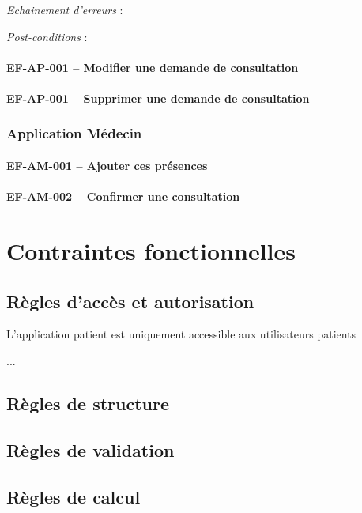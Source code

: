 \documentclass[a4paper,11pt]{article}
\begin{document}
	\textit{Echainement d'erreurs} :
	
	\textit{Post-conditions} :
	
	\paragraph{EF-AP-001 -- Modifier une demande de consultation}
	
	\paragraph{EF-AP-001 -- Supprimer une demande de consultation}

	\subsubsection{Application Médecin}
	
	\paragraph{EF-AM-001 -- Ajouter ces présences}

	\paragraph{EF-AM-002 -- Confirmer une consultation}
	
	\newpage
	
	\section{Contraintes fonctionnelles}
	
	\subsection{Règles d'accès et autorisation}
	
	L'application patient est uniquement accessible aux utilisateurs patients
	
	...
	
	\subsection{Règles de structure}
	
	\subsection{Règles de validation}
	
	\subsection{Règles de calcul}
	
\end{document}

